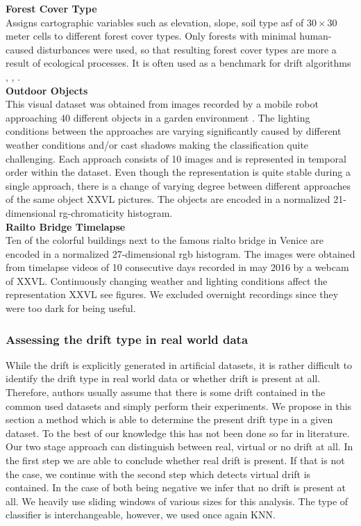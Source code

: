 \documentclass[conference]{IEEEtran}
\begin{document}
\textbf{Forest Cover Type}\\
Assigns cartographic variables such as elevation, slope, soil type asf of $30 \times 30$ meter cells to different forest cover types. 
Only forests with minimal human-caused disturbances were used, so that resulting forest cover types are more a result of ecological processes.
It is often used as a benchmark for drift algorithms \cite{Bifet:2013:EDS:2480362.2480516}, \cite{gama2003accurate}, \cite{oza2001experimental}.\\
\textbf{Outdoor Objects}\\
This visual dataset was obtained from images recorded by a mobile robot approaching 40 different objects in a garden environment \cite{losing2015interactive}. The lighting conditions between 
the approaches are varying significantly caused by different weather conditions and/or cast shadows making the classification quite challenging. Each approach
consists of 10 images and is represented in temporal order within the dataset. Even though the representation is quite stable during a single approach, there is a change of varying degree between different
approaches of the same object XXVL pictures. The objects are encoded in a normalized 21-dimensional rg-chromaticity histogram.\\
\textbf{Railto Bridge Timelapse}\\
Ten of the colorful buildings next to the famous rialto bridge in Venice are encoded in a normalized 27-dimensional rgb histogram. 
The images were obtained from timelapse videos of 10 consecutive days recorded in may 2016 by a webcam of XXVL. Continuously changing weather and lighting conditions affect the representation  XXVL see figures. We excluded overnight recordings since they were too dark for being useful.
\subsubsection{Assessing the drift type in real world data}
While the drift is explicitly generated in artificial datasets, it is rather difficult to identify the drift type in real world data or whether drift is present at all. Therefore, authors usually
assume that there is some drift contained in the common used datasets and simply perform their experiments. We propose in this section a method which is able to determine the present drift type in a 
given dataset. To the best of our knowledge this has not been done so far in literature. Our two stage approach can distinguish between real, virtual or no drift at all. 
In the first step we are able to conclude whether real drift is present. If that is not the case, we continue with the second step which detects virtual drift is contained. In the case of both
being negative we infer that no drift is present at all. We heavily use sliding windows of various sizes for this analysis. The type of classifier is interchangeable, however, we used once again KNN.\\
\end{document}
